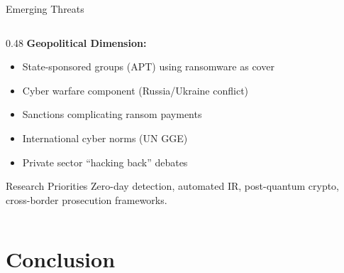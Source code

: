 \documentclass[aspectratio=169]{beamer}
\begin{document}
\begin{frame}{Emerging Threats}
\begin{columns}[T]
\begin{column}{0.48\textwidth}
      \vspace{0.5em}
      \textbf{Geopolitical Dimension:}
      \begin{itemize}
        \item State-sponsored groups (APT) using ransomware as cover
        \item Cyber warfare component (Russia/Ukraine conflict)
        \item Sanctions complicating ransom payments
        \item International cyber norms (UN GGE)
        \item Private sector ``hacking back'' debates
      \end{itemize}

      \vspace{0.3em}
      \begin{infobox}{Research Priorities}
        Zero-day detection, automated IR, post-quantum crypto, cross-border prosecution frameworks.
      \end{infobox}
    \end{column}
  \end{columns}
\end{frame}

\section{Conclusion}
\end{document}
